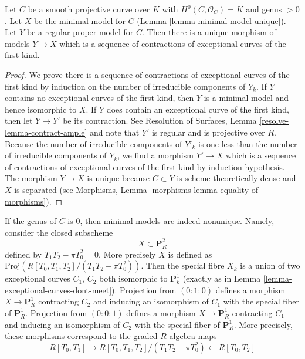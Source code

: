 \begin{lemma}
\label{lemma-minimal-model-mapping-property}
Let $C$ be a smooth projective curve over $K$ with $H^0(C, \mathcal{O}_C) = K$
and genus $> 0$. Let $X$ be the minimal model for $C$
(Lemma \ref{lemma-minimal-model-unique}).
Let $Y$ be a regular proper model for $C$. Then there is a unique
morphism of models $Y \to X$ which is a sequence of contractions of
exceptional curves of the first kind.
\end{lemma}

\begin{proof}
We prove there is a sequence of contractions of exceptional curves
of the first kind by induction on the number of irreducible components
of $Y_k$. If $Y$ contains no exceptional curves of the first kind,
then $Y$ is a minimal model and hence isomorphic to $X$. If $Y$
does contain an exceptional curve of the first kind, then let
$Y \to Y'$ be its contraction. See
Resolution of Surfaces, Lemma \ref{resolve-lemma-contract-ample}
and note that $Y'$ is regular and is projective over $R$.
Because the number of irreducible components of $Y'_k$ is one
less than the number of irreducible components of $Y_k$, we
find a morphism $Y' \to X$ which is a
sequence of contractions of exceptional curves of the first kind
by induction hypothesis. The morphism $Y \to X$ is unique because
$C \subset Y$ is scheme theoretically dense and $X$ is separated
(see Morphisms, Lemma \ref{morphisms-lemma-equality-of-morphisms}).
\end{proof}

\begin{example}
\label{example-nonunique-in-genus-zero}
If the genus of $C$ is $0$, then minimal models are indeed nonunique.
Namely, consider the closed subscheme
$$
X \subset \mathbf{P}^2_R
$$
defined by $T_1T_2 - \pi T_0^2 = 0$. More precisely $X$ is defined
as $\text{Proj}(R[T_0, T_1, T_2]/(T_1T_2 - \pi T_0^2))$. Then the
special fibre $X_k$ is a union of two exceptional curves $C_1$, $C_2$ both
isomorphic to $\mathbf{P}^1_k$
(exactly as in Lemma \ref{lemma-exceptional-curves-dont-meet}).
Projection from $(0 : 1 : 0)$ defines a morphism $X \to \mathbf{P}^1_R$
contracting $C_2$ and inducing an isomorphism of $C_1$ with the special
fiber of $\mathbf{P}^1_R$. Projection from $(0 : 0 : 1)$ defines a
morphism $X \to \mathbf{P}^1_R$ contracting $C_1$ and inducing an
isomorphism of $C_2$ with the special fiber of $\mathbf{P}^1_R$.
More precisely, these morphisms correspond to the graded $R$-algebra
maps
$$
R[T_0, T_1] \longrightarrow
R[T_0, T_1, T_2]/(T_1T_2 - \pi T_0^2) \longleftarrow
R[T_0, T_2]
$$
\end{example}






